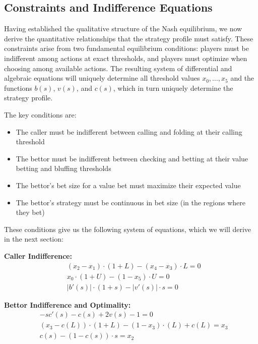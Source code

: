\documentclass[../../main/main.tex]{subfiles}
\begin{document}
\subsection{Constraints and Indifference Equations}
\label{subsec:constraints}

Having established the qualitative structure of the Nash equilibrium, we now derive the quantitative relationships that the strategy profile must satisfy. These constraints arise from two fundamental equilibrium conditions: players must be indifferent among actions at exact thresholds, and players must optimize when choosing among available actions. The resulting system of differential and algebraic equations will uniquely determine all threshold values $x_0, \ldots, x_5$ and the functions $b(s)$, $v(s)$, and $c(s)$, which in turn uniquely determine the strategy profile.

The key conditions are:

\begin{itemize}
    \item The caller must be indifferent between calling and folding at their calling threshold
    \item The bettor must be indifferent between checking and betting at their value betting and bluffing thresholds
    \item The bettor's bet size for a value bet must maximize their expected value
    \item The bettor's strategy must be continuous in bet size (in the regions where they bet)
\end{itemize}

These conditions give us the following system of equations, which we will derive in the next section: \label{eq:nash_equilibrium_system}

\textbf{Caller Indifference:}
\begin{align}
    & (x_2-x_1) \cdot (1+L) - (x_4-x_3) \cdot L = 0 \\
    & x_0 \cdot (1+U) - (1-x_5) \cdot U = 0\\
    & |b'(s)| \cdot (1 + s) - |v'(s)| \cdot s = 0
\end{align}

\textbf{Bettor Indifference and Optimality:}
\begin{align}
    & -sc'(s) - c(s) + 2 v(s) - 1 = 0 \label{eq:valueoptimality}\\
    & (x_3-c(L)) \cdot (1+L) - (1-x_3) \cdot (L) + c(L) = x_3 \label{eq:valueindiff}\\ 
    & c(s) - (1-c(s)) \cdot s = x_2 \label{eq:bluffindiff}
\end{align}
\end{document}
